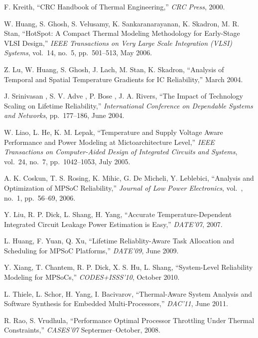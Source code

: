 \begin{thebibliography}{99}
    F. Kreith,
    ``CRC Handbook of Thermal Engineering,''
    \emph{CRC Press},
    2000.

    W. Huang, S. Ghosh, S. Velusamy, K. Sankaranarayanan, K. Skadron, M. R. Stan,
    ``HotSpot: A Compact Thermal Modeling Methodology for Early-Stage VLSI Design,''
    \emph{IEEE Transactions on Very Large Scale Integration (VLSI) Systems},
    vol.~14, no.~5, pp.~501--513, May 2006.

    Z. Lu, W. Huang, S. Ghosh, J. Lach, M. Stan, K. Skadron,
    ``Analysis of Temporal and Spatial Temperature Gradients for IC Reliability,''
    March 2004.

    J. Srinivasan , S. V. Adve , P. Bose , J. A. Rivers,
    ``The Impact of Technology Scaling on Lifetime Reliability,''
    \emph{International Conference on Dependable Systems and Networks},
    pp.~177--186, June 2004.

    W. Liao, L. He, K. M. Lepak,
    ``Temperature and Supply Voltage Aware Performance and Power Modeling at Mictoarchitecture Level,''
    \emph{IEEE Transactions on Computer-Aided Design of Integrated Circuits and Systems},
    vol.~24, no.~7, pp.~1042--1053, July 2005.

    A. K. Coskun, T. S. Rosing, K. Mihic, G. De Micheli, Y. Leblebici,
    ``Analysis and Optimization of MPSoC Reliability,''
    \emph{Journal of Low Power Electronics},
    vol.~, no.~1, pp.~56--69, 2006.

    Y. Liu, R. P. Dick, L. Shang, H. Yang,
    ``Accurate Temperature-Dependent Integrated Circuit Leakage Power Estimation is Easy,''
    \emph{DATE'07},
    2007.

    L. Huang, F. Yuan, Q. Xu,
    ``Lifetime Reliablity-Aware Task Allocation and Scheduling for MPSoC Platforms,''
    \emph{DATE'09},
    June 2009.

    Y. Xiang, T. Chantem, R. P. Dick, X. S. Hu, L. Shang,
    ``System-Level Reliability Modeling for MPSoCs,''
    \emph{CODES+ISSS'10},
    October 2010.

    L. Thiele, L. Schor, H. Yang, I. Bacivarov,
    ``Thermal-Aware System Analysis and Software Synthesis for Embedded Multi-Processors,''
    \emph{DAC'11},
    June 2011.

    R. Rao, S. Vrudhula,
    ``Performance Optimal Processor Throttling Under Thermal Constraints,''
    \emph{CASES'07}
    Septermer--October, 2008.


\end{thebibliography}
